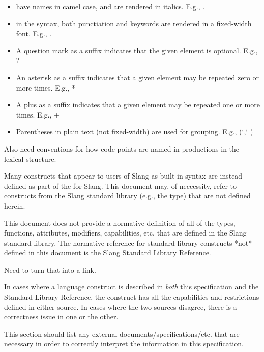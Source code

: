 \begin{itemize}
    \item{ have names in camel case, and are rendered in italics. E.g., .}
    \item{ in the syntax, both punctiation and keywords are rendered in a fixed-width font. E.g., .}
    \item{A question mark as a suffix indicates that the given element is optional. E.g., ?}
    \item{An asterisk as a suffix indicates that a given element may be repeated zero or more times. E.g.,  *}
    \item{A plus as a suffix indicates that a given element may be repeated one or more times. E.g., +}
    \item{Parentheses in plain text (not fixed-width) are used for grouping. E.g.,  (`,` )}
\end{itemize}

\begin{Incomplete}
Also need conventions for how code points are named in productions in the lexical structure.    
\end{Incomplete}



Many constructs that appear to users of Slang as built-in syntax are instead defined as part of the  for Slang.
This document may, of neccessity, refer to constructs from the Slang standard library (e.g., the  type) that are not defined herein.

This document does not provide a normative definition of all of the types, functions, attributes, modifiers, capabilities, etc. that are defined in the Slang standard library.
The normative reference for standard-library constructs *not* defined in this document is the Slang Standard Library Reference.

\begin{Incomplete}
Need to turn that into a link.
\end{Incomplete}

In cases where a language construct is described in \emph{both} this specification and the Standard Library Reference, the construct has all the capabilities and restrictions defined in either source.
In cases where the two sources disagree, there is a correctness issue in one or the other.


\begin{Incomplete}
This section should list any external documents/specifications/etc. that are necessary in order to correctly interpret the information in this specification.
\end{Incomplete}
